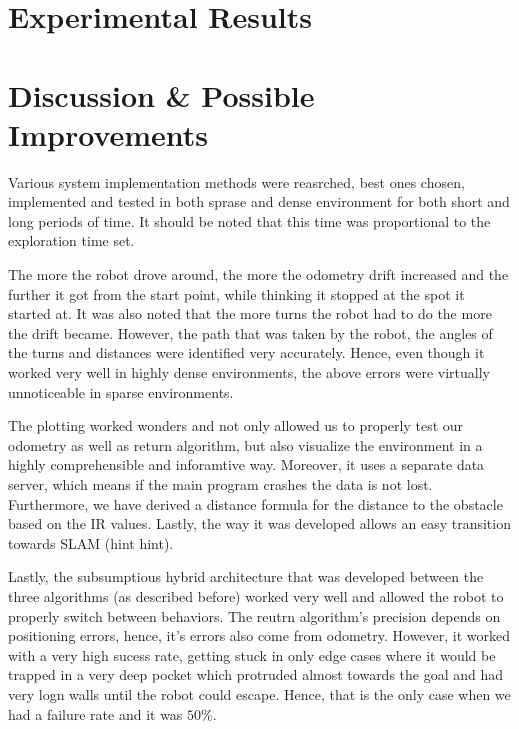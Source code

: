 \documentclass[11pt, a4paper]{article}
\begin{document}

\section{Experimental Results}
\label{Experimental Results}






\section{Discussion \& Possible Improvements}

\label{Results}


Various system implementation methods were reasrched, best ones chosen, implemented and 
tested in both sprase and dense environment for both short and long periods of time. It
should be noted that this time was proportional to the exploration time set.

The more the robot drove around, the more the odometry drift increased and the further it got from the 
start point, while thinking it stopped at the spot it started at. It was also noted that the more 
turns the robot had to do the more the drift became. However, the path that was taken by the robot,
the angles of the turns and distances were identified very accurately. Hence, even though it worked very 
well in highly dense environments, the above errors were virtually unnoticeable in sparse environments.

The plotting worked wonders and not only allowed us to properly test our odometry as well as return algorithm,
but also visualize the environment in a highly comprehensible and inforamtive way. Moreover, it uses a separate
data server, which means if the main program crashes the data is not lost. Furthermore, we have derived a 
distance formula for the distance to the obstacle based on the IR values. Lastly, the way it was developed 
allows an easy transition towards SLAM (hint hint).

Lastly, the subsumptious hybrid architecture that was developed between the three algorithms (as described
before) worked very well and allowed the robot to properly switch between behaviors. The reutrn algorithm's precision
depends on positioning errors, hence, it's errors also come from odometry. However, it worked with a
very high sucess rate, getting stuck in only edge cases where it would be trapped in a very deep pocket which
protruded almost towards the goal and had very logn walls until the robot could escape. Hence, that is the only case
when we had a failure rate and it was $50\%$. %
\end{document}
